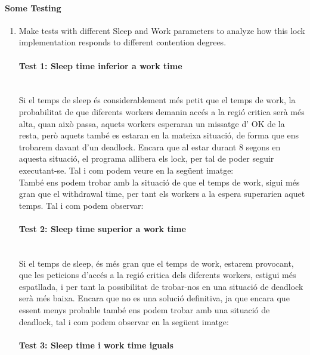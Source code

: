 \documentclass[a4paper, 10pt]{article}
\begin{document}
\paragraph[bold]{Some Testing}
\begin{enumerate}
\item Make tests with different Sleep and Work parameters to analyze how this lock implementation responds to different contention degrees.
\paragraph[bold]{Test 1: Sleep time inferior a work time\\\\}
Si el temps de sleep és considerablement més petit que el temps de work, la probabilitat de que diferents workers demanin accés a la regió critica serà més alta, quan això passa, aquets workers esperaran un missatge d' OK de la resta, però aquets també es estaran en la mateixa situació, de forma que ens trobarem davant d'un deadlock. Encara que al estar durant 8 segons en aquesta situació, el programa allibera els lock, per tal de poder seguir executant-se. Tal i com podem veure en la següent imatge:\\

També ens podem trobar amb la situació de que el temps de work, sigui més gran que el withdrawal time, per tant els workers a la espera superarien aquet temps. Tal i com podem observar:

\paragraph[bold]{Test 2: Sleep time superior a work time\\\\}
Si el temps de sleep, és més gran que el temps de work, estarem provocant, que les peticions d’accés a la regió critica dels diferents workers, estigui més espatllada, i per tant la possibilitat de trobar-nos en una situació de deadlock serà més baixa. Encara que no es una solució definitiva, ja que encara que essent menys probable també ens podem trobar amb una situació de deadlock, tal i com podem observar en la següent imatge:\\

\paragraph[bold]{Test 3: Sleep time i work time iguals\\\\}


\end{enumerate}
\end{document}
